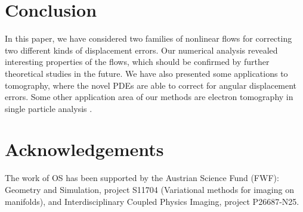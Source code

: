 \documentclass[runningheads,a4paper]{llncs}\usepackage{latexsym}
\begin{document}
\section{Conclusion}
In this paper, we have considered two families of nonlinear flows for correcting two different kinds of 
displacement errors. Our numerical analysis revealed interesting properties of the flows,
which should be confirmed by further theoretical studies in the future.
We have also presented some applications to tomography, where the novel PDEs are able to correct for 
angular displacement errors.
Some other application area of our methods are electron tomography in single particle analysis \cite{NatWue01,Oek15}.

\section*{Acknowledgements}
The work of OS has been supported by the Austrian Science Fund (FWF): Geometry and Simulation, project S11704 (Variational methods for imaging on manifolds), and Interdisciplinary Coupled Physics Imaging, project P26687-N25.
\end{document}
